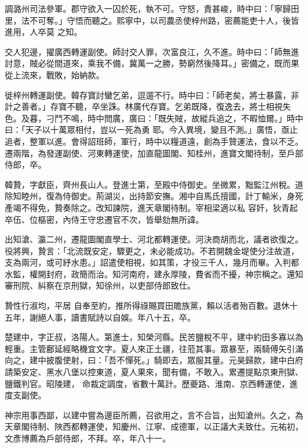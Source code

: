 \begin{pinyinscope}
 調潞州司法參軍。郡守欲入一囚於死，執不可。守怒，責甚峻，時中曰：「寧歸田里，法不可奪。」守悟而聽之。熙寧中，以司農丞使梓州路，密薦能吏十人，後皆進用，人卒莫
 之知。



 交人犯邊，擢廣西轉運副使。師討交人罪，次富良江，久不進。時中曰：「師無進討意，賊必從間道來，乘我不備，冀萬一之勝，勢窮然後降耳。」密備之，既而果從上流來，戰敗，始納款。



 徙梓州轉運副使。韓存寶討蠻乞弟，逗遛不行。時中曰：「師老矣，將士暴露，非計之善者。」存寶不聽，卒坐誅。林廣代存寶。乞弟既降，復逸去，將士相視失色。及暮，刁鬥不鳴，時中問廣，廣曰：「既失賊，故縱兵追之，不暇恤爾。」時中曰：「天子以十萬眾相付，豈以一死為勇
 耶。今入異境，變且不測。」廣悟，亟止追者，整軍以進。會得詔班師，軍行，時中以糧道遠，創為手贊運法，食以不乏。遷兩階，為發運副使、河東轉運使，加直龍圖閣、知桂州，進寶文閣待制，至戶部侍郎，卒。



 韓贄，字獻臣，齊州長山人。登進士第，至殿中侍御史。坐微累，黜監江州稅。道除知睦州，復為侍御史。荊湖災，出持節安撫。湘中自馬氏擅國，計丁輸米，身死產竭不得免，贄奏除之。改知諫院，進天章閣待制。宰相梁適以私
 容奸，狄青起卒伍、位樞密，內侍王守忠遷官不次，皆舉劾無所諱。



 出知滄、瀛二州，遷龍圖閣直學士、河北都轉運使。河決商胡而北，議者欲復之。役將興，贄言：「北流既安定，驟更之，未必能成功。不若開魏金堤使分注故道，支為兩河，或可紓水患。」詔遣使相視，如其策，才役三千人，幾月而畢。入判都水監，權開封府，政簡而治。知河南府，建永厚陵，費省而不擾，神宗稱之。還知審刑院、糾察在京刑獄，知徐州，以吏部侍郎致仕。



 贄性行淑均，平居
 自奉至約，推所得祿賜買田贍族黨，賴以活者殆百數。退休十五年，謝絕人事，讀書賦詩以自娛。年八十五，卒。



 楚建中，字正叔，洛陽人。第進士，知榮河縣。民苦鹽稅不平，建中約田多寡以為輕重。主管鄜延經略機宜文字。夏人來正土疆，往蒞其事。眾暴至，兩騎傅矢引滿向之，建中披腹使射，曰：「吾不憚死。」騎即去，眾服其量。元昊歸款，建中白府請築安定、黑水八堡以控東道，夏人果來，聞有備，不敢入。累遷提點京東刑獄、鹽鐵判官。昭陵建，
 命裁定調度，省數十萬計。歷夔路、淮南、京西轉運使，進度支副使。



 神宗用事西鄙，以建中嘗為邊臣所薦，召欲用之，言不合旨，出知滄州。久之，為天章閣待制、陜西都轉運使，知慶州、江寧、成德軍，以正議大夫致仕。元祐初，文彥博薦為戶部侍郎，不拜。卒，年八十一。




\end{pinyinscope}
